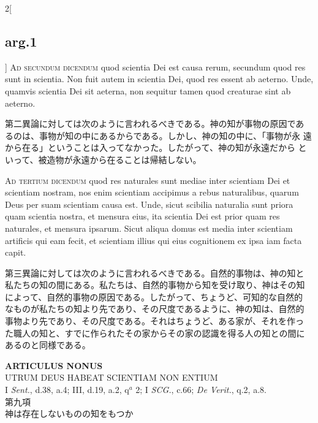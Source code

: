 \documentclass[paper=a4paper,fontsize=10pt,jafontsize=9pt,titlepage]{jlreq}
\begin{document}
\begin{paracol}{2}[\subsection{arg.1}]
{\scshape Ad secundum dicendum} quod scientia Dei est causa rerum,
secundum quod res sunt in scientia. Non fuit autem in scientia Dei,
quod res essent ab aeterno. Unde, quamvis scientia Dei sit aeterna,
non sequitur tamen quod creaturae sint ab aeterno.

\switchcolumn

第二異論に対しては次のように言われるべきである。神の知が事物の原因であ
るのは、事物が知の中にあるからである。しかし、神の知の中に、「事物が永
遠から在る」ということは入ってなかった。したがって、神の知が永遠だから
といって、被造物が永遠から在ることは帰結しない。

\switchcolumn*[\subsection{ad.3}]

{\scshape Ad tertium dicendum} quod res naturales sunt mediae inter
scientiam Dei et scientiam nostram, nos enim scientiam accipimus a
rebus naturalibus, quarum Deus per suam scientiam causa est. Unde,
sicut scibilia naturalia sunt priora quam scientia nostra, et mensura
eius, ita scientia Dei est prior quam res naturales, et mensura
ipsarum. Sicut aliqua domus est media inter scientiam artificis qui
eam fecit, et scientiam illius qui eius cognitionem ex ipsa iam facta
capit.

\switchcolumn

第三異論に対しては次のように言われるべきである。自然的事物は、神の知と
私たちの知の間にある。私たちは、自然的事物から知を受け取り、神はその知
によって、自然的事物の原因である。したがって、ちょうど、可知的な自然的
なものが私たちの知より先であり、その尺度であるように、神の知は、自然的
事物より先であり、その尺度である。それはちょうど、ある家が、それを作っ
た職人の知と、すでに作られたその家からその家の認識を得る人の知との間に
あるのと同様である。

\end{paracol}



\newpage



{}
\setcounter{section}{9}
\setcounter{subsection}{0}
\begin{center}
{\Large {\bfseries ARTICULUS NONUS}}\\ {\large UTRUM DEUS HABEAT SCIENTIAM
NON ENTIUM}\\ {\footnotesize I {\itshape Sent.}, d.38, a.4; III,
d.19, a.2, q$^a$ 2; I {\itshape SCG.}, c.66; {\itshape De Verit.},
q.2, a.8.}\\ {\Large 第九項\\神は存在しないものの知をもつか}
\end{center}
\end{document}
